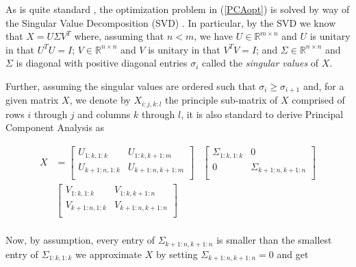 \documentclass[conference]{IEEEtran}
\begin{document}
As is quite standard \cite{HastieTrevorTibshiraniRobertFriedman2009}, the optimization problem in (\ref{PCAopt}) is solved by way of the Singular Value Decomposition (SVD) \cite{Eckart1936}.  In particular, by the SVD we know that $X=U \Sigma V^T$ where, assuming that $n<m$, we have $U \in \mathbb{R}^{m \times n}$ and $U$ is unitary in that $U^T U = I$; $V \in \mathbb{R}^{n \times n}$ and $V$ is unitary in that $V^T V = I$; and $\Sigma \in \mathbb{R}^{n \times n}$ and $\Sigma$ is diagonal with positive diagonal entries $\sigma_i$ called the \emph{singular values} of $X$.

Further, assuming the singular values are ordered such that $\sigma_i \ge \sigma_{i+1}$
and, for a given matrix $X$, we denote by $X_{i:j,k:l}$ the principle sub-matrix of $X$ comprised of rows $i$ through $j$ and columns $k$ through $l$, it is also standard \cite{HastieTrevorTibshiraniRobertFriedman2009} to derive Principal Component Analysis as 

\begin{align*}
X 
& = 
\begin{bmatrix}
U_{1:k,1:k} & U_{1:k,k+1:m} \\
U_{k+1:n,1:k} & U_{k+1:n,k+1:m} \\
\end{bmatrix}
&
\begin{bmatrix}
\Sigma_{1:k,1:k} & 0 \\
0 & \Sigma_{k+1:n,k+1:n} \\
\end{bmatrix} \\
&
\begin{bmatrix}
V_{1:k,1:k} & V_{1:k,k+1:n} \\
V_{k+1:n,1:k} & V_{k+1:n,k+1:n} \\
\end{bmatrix} \\
\end{align*}

\noindent Now, by assumption, every entry of $\Sigma_{k+1:n,k+1:n}$ is smaller than the smallest
entry of $\Sigma_{1:k,1:k}$ we approximate $X$ by setting $\Sigma_{k+1:n,k+1:n}=0$
and get
\end{document}
